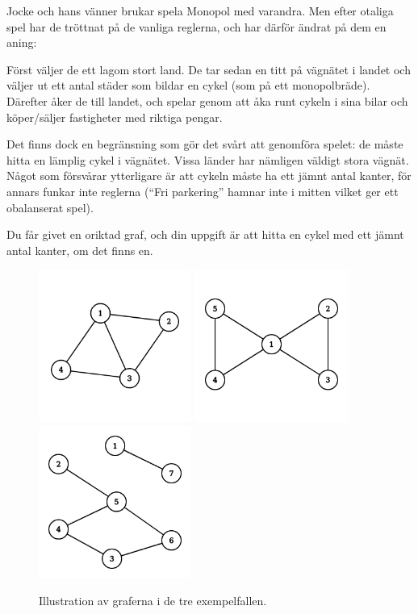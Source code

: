
Jocke och hans vänner brukar spela Monopol med varandra. Men efter otaliga spel har de tröttnat
på de vanliga reglerna, och har därför ändrat på dem en aning:


Först väljer de ett lagom stort land. De tar sedan en titt på vägnätet i landet och väljer ut ett
antal städer som bildar en cykel (som på ett monopolbräde). Därefter åker de till landet, och spelar
genom att åka runt cykeln i sina bilar och köper/säljer fastigheter med riktiga pengar.


Det finns dock en begränsning som gör det svårt att genomföra spelet: de måste hitta en lämplig
cykel i vägnätet. Vissa länder har nämligen väldigt stora vägnät. Något som försvårar ytterligare är 
att cykeln måste ha ett jämnt antal kanter, för annars funkar inte reglerna (``Fri parkering'' hamnar inte
i mitten vilket ger ett obalanserat spel).


Du får givet en oriktad graf, och din uppgift är att hitta en cykel med ett jämnt antal kanter, 
om det finns en.

\begin{figure}[!h]
\begin{center}
  \includegraphics[width=5cm]{sample1.png}
  \quad
  \includegraphics[width=5cm]{sample2.png}
  \quad
  \includegraphics[width=5cm]{sample3.png}
\end{center}
  \caption{Illustration av graferna i de tre exempelfallen.}
\end{figure}

